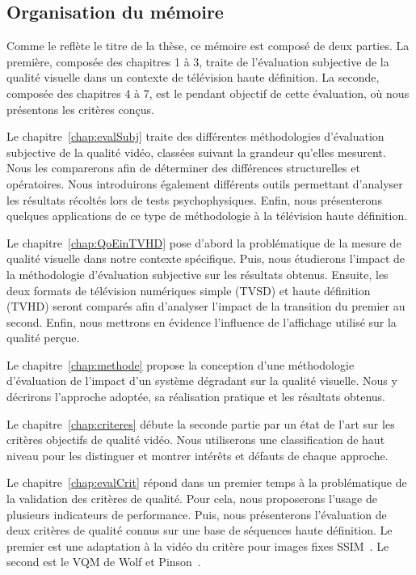 \subsection*{Organisation du mémoire}
Comme le reflète le titre de la thèse, ce mémoire est composé de deux parties. La première, composée des chapitres 1 à 3, traite de l'évaluation subjective de la qualité visuelle dans un contexte de télévision haute définition. La seconde, composée des chapitres 4 à 7, est le pendant objectif de cette évaluation, où nous présentons les critères conçus.

\bigskip

Le chapitre~\ref{chap:evalSubj} traite des différentes méthodologies d'évaluation subjective de la qualité vidéo, classées suivant la grandeur qu'elles mesurent. Nous les comparerons afin de déterminer des différences structurelles et opératoires. Nous introduirons également différents outils permettant d'analyser les résultats récoltés lors de tests psychophysiques. Enfin, nous présenterons quelques applications de ce type de méthodologie à la télévision haute définition.

Le chapitre~\ref{chap:QoEinTVHD} pose d'abord la problématique de la mesure de qualité visuelle dans notre contexte spécifique. Puis, nous étudierons l'impact de la méthodologie d'évaluation subjective sur les résultats obtenus. Ensuite, les deux formats de télévision numériques simple (TVSD) et haute définition (TVHD) seront comparés afin d'analyser l'impact de la transition du premier au second. Enfin, nous mettrons en évidence l'influence de l'affichage utilisé sur la qualité perçue.

Le chapitre~\ref{chap:methode} propose la conception d'une méthodologie d'évaluation de l'impact d'un système dégradant sur la qualité visuelle. Nous y décrirons l'approche adoptée, sa réalisation pratique et les résultats obtenus. %


Le chapitre~\ref{chap:criteres} débute la seconde partie par un état de l'art sur les critères objectifs de qualité vidéo. Nous utiliserons une classification de haut niveau pour les distinguer et montrer intérêts et défauts de chaque approche.

Le chapitre~\ref{chap:evalCrit} répond dans un premier temps à la problématique de la validation des critères de qualité. Pour cela, nous proposerons l'usage de plusieurs indicateurs de performance. Puis, nous présenterons l'évaluation de deux critères de qualité connus sur une base de séquences haute définition. Le premier est une adaptation à la vidéo du critère pour images fixes SSIM~\cite{wang-vqasdm}. Le second est le VQM de Wolf et Pinson~\cite{wolf-vqmtech}.


